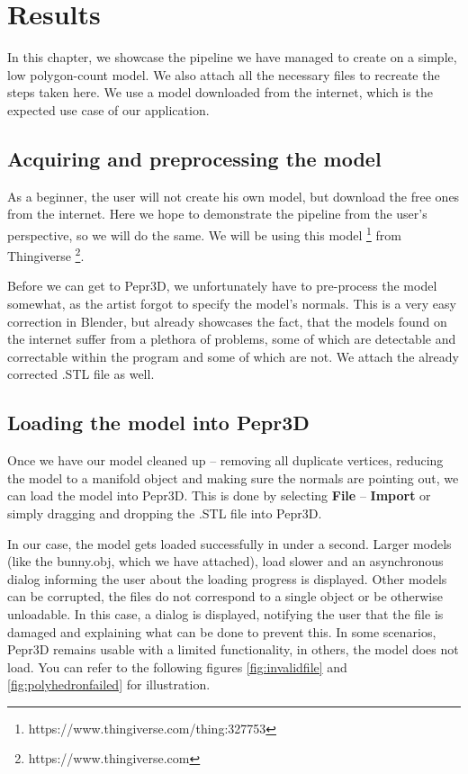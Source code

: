 \chapter{Results}

In this chapter, we showcase the pipeline we have managed to create on a simple, low polygon-count model. We also attach all the necessary files to recreate the steps taken here. We use a model downloaded from the internet, which is the expected use case of our application.

\section{Acquiring and preprocessing the model}

As a beginner, the user will not create his own model, but download the free ones from the internet. Here we hope to demonstrate the pipeline from the user's perspective, so we will do the same. We will be using this model \footnote{https://www.thingiverse.com/thing:327753} from Thingiverse \footnote{https://www.thingiverse.com}.

Before we can get to Pepr3D, we unfortunately have to pre-process the model somewhat, as the artist forgot to specify the model's normals. This is a very easy correction in Blender, but already showcases the fact, that the models found on the internet suffer from a plethora of problems, some of which are detectable and correctable within the program and some of which are not. We attach the already corrected .STL file as well.

\section{Loading the model into Pepr3D}

Once we have our model cleaned up -- removing all duplicate vertices, reducing the model to a manifold object and making sure the normals are pointing out, we can load the model into Pepr3D. This is done by selecting \textbf{File} -- \textbf{Import} or simply dragging and dropping the .STL file into Pepr3D.

In our case, the model gets loaded successfully in under a second. Larger models (like the bunny.obj, which we have attached), load slower and an asynchronous dialog informing the user about the loading progress is displayed. Other models can be corrupted, the files do not correspond to a single object or be otherwise unloadable. In this case, a dialog is displayed, notifying the user that the file is damaged and explaining what can be done to prevent this. In some scenarios, Pepr3D remains usable with a limited functionality, in others, the model does not load. You can refer to the following figures \ref{fig:invalidfile} and \ref{fig:polyhedronfailed} for illustration.

